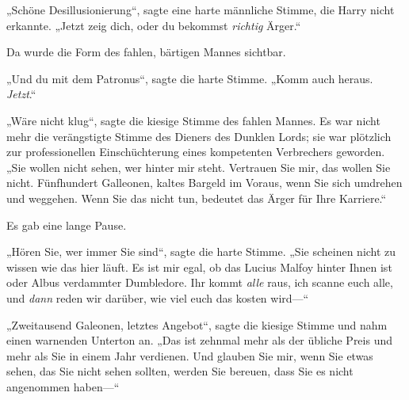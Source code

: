 „Schöne Desillusionierung“, sagte eine harte männliche Stimme, die Harry nicht erkannte. „Jetzt zeig dich, oder du bekommst \emph{richtig} Ärger.“

Da wurde die Form des fahlen, bärtigen Mannes sichtbar.

„Und du mit dem Patronus“, sagte die harte Stimme. „Komm auch heraus. \emph{Jetzt}.“

„Wäre nicht klug“, sagte die kiesige Stimme des fahlen Mannes. Es war nicht mehr die verängstigte Stimme des Dieners des Dunklen Lords; sie war plötzlich zur professionellen Einschüchterung eines kompetenten Verbrechers geworden. „Sie wollen nicht sehen, wer hinter mir steht. Vertrauen Sie mir, das wollen Sie nicht. Fünfhundert Galleonen, kaltes Bargeld im Voraus, wenn Sie sich umdrehen und weggehen. Wenn Sie das nicht tun, bedeutet das Ärger für Ihre Karriere.“

Es gab eine lange Pause.

„Hören Sie, wer immer Sie sind“, sagte die harte Stimme. „Sie scheinen nicht zu wissen wie das hier läuft. Es ist mir egal, ob das Lucius Malfoy hinter Ihnen ist oder Albus verdammter Dumbledore. Ihr kommt \emph{alle} raus, ich scanne euch alle, und \emph{dann} reden wir darüber, wie viel euch das kosten wird—“

„Zweitausend Galeonen, letztes Angebot“, sagte die kiesige Stimme und nahm einen warnenden Unterton an. „Das ist zehnmal mehr als der übliche Preis und mehr als Sie in einem Jahr verdienen. Und glauben Sie mir, wenn Sie etwas sehen, das Sie nicht sehen sollten, werden Sie bereuen, dass Sie es nicht angenommen haben—“

